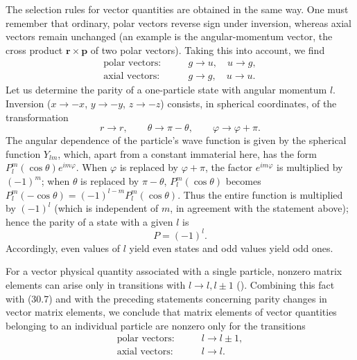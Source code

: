 The selection rules for vector quantities are obtained in the same way. One
must remember that ordinary, polar vectors reverse sign under inversion,
whereas axial vectors remain unchanged (an example is the angular-momentum
vector, the cross product $\mathbf r\times\mathbf p$ of two polar vectors).
Taking this into account, we find
\begin{equation}
 \begin{aligned}
  \text{polar vectors:}&\qquad g\to u,\quad u\to g,\\
  \text{axial vectors:}&\qquad g\to g,\quad u\to u.
 \end{aligned}
 \tag{30.5}
\end{equation}
Let us determine the parity of a one-particle state with angular momentum
$l$. Inversion ($x\to-x$, $y\to-y$, $z\to-z$) consists,
in spherical coordinates, of the transformation
\begin{equation}
  r\to r,\qquad \theta\to\pi-\theta,\qquad
  \varphi\to\varphi+\pi.
  \tag{30.6}
\end{equation}
The angular dependence of the particle's wave function is given by the
spherical function $Y_{lm}$, which, apart from a constant immaterial here,
has the form $P_l^m(\cos\theta)e^{im\varphi}$. When $\varphi$ is replaced by
$\varphi+\pi$, the factor $e^{im\varphi}$ is multiplied by $(-1)^m$; when
$\theta$ is replaced by $\pi-\theta$, $P_l^m(\cos\theta)$ becomes
$P_l^m(-\cos\theta)=(-1)^{l-m}P_l^m(\cos\theta)$. Thus the entire function is
multiplied by $(-1)^l$ (which is independent of $m$, in agreement with the
statement above); hence the parity of a state with a given $l$ is
\begin{equation}
  P=(-1)^l.
  \tag{30.7}
\end{equation}
Accordingly, even values of $l$ yield even states and odd values yield odd
ones.

For a vector physical quantity associated with a single particle, nonzero
matrix elements can arise only in transitions with $l\to l,l\pm1$ (). Combining
this fact with (30.7) and with the preceding statements concerning parity
changes in vector matrix elements, we conclude that matrix elements of vector
quantities belonging to an individual particle are nonzero only for the
transitions
\begin{equation}
 \begin{aligned}
  \text{polar vectors:}&\qquad l\to l\pm1,\\
  \text{axial vectors:}&\qquad l\to l.
 \end{aligned}
 \tag{30.8}
\end{equation}
